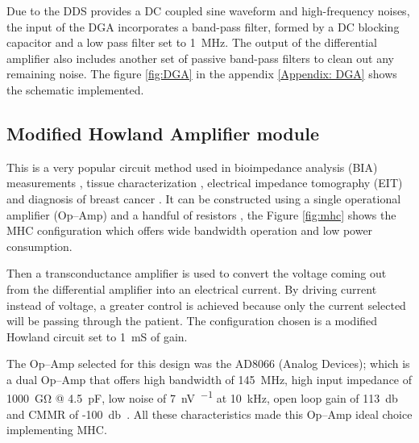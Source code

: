 
Due to the DDS provides a DC coupled sine waveform and high-frequency noises, the input of the DGA incorporates a band-pass filter, formed by a DC blocking capacitor and a low pass filter set to \SI{1}{\mega\hertz}. The output of the differential amplifier also includes another set of passive band-pass filters to clean out any remaining noise. The figure \ref{fig:DGA} in the appendix \ref{Appendix: DGA} shows the schematic implemented. 


\subsection{Modified Howland Amplifier module}
\label{section MHC}
This is a very popular circuit method used in bioimpedance analysis (BIA) measurements \cite{aroom2009bioimpedance}, tissue characterization \cite{bertemes2002tissue,ross2003current}, electrical impedance tomography (EIT) and diagnosis of breast cancer \cite{zou2003review,saulnier2007electrical}. It can be constructed using a single operational amplifier (Op–Amp) and a handful of resistors \cite{sheingold1964impedance}, the Figure \ref{fig:mhc} shows the MHC configuration which offers wide bandwidth operation and low power consumption. 

Then a transconductance amplifier is used to convert the voltage coming out from the differential amplifier into an electrical current. By driving current instead of voltage, a greater control is achieved because only the current selected will be passing through the patient. The configuration chosen is a modified Howland circuit set to \SI{1}{\milli\siemens} of gain.

The Op–Amp selected for this design was the AD8066 (Analog Devices); which is a dual Op–Amp that offers high bandwidth of \SI{145}{\mega\hertz}, high input impedance of \SI{1000}{\giga\ohm} @ \SI{4.5}{\pF}, low noise of \SI{7}{\nano\volt\per{}} at \SI{10}{\kilo\hertz}, open loop gain of \SI{113}{\decibel} and CMMR of -\SI{100}{\decibel}~\cite{ad:AD8066}. All these characteristics made this Op–Amp ideal choice implementing MHC.


